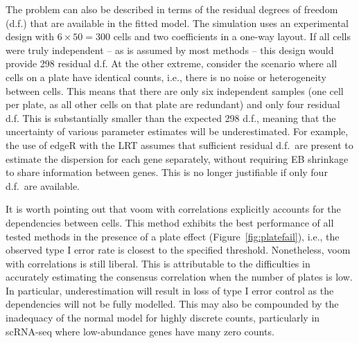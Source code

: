 \documentclass[oupdraft]{bio}
\begin{document}
The problem can also be described in terms of the residual degrees of freedom (d.f.) that are available in the fitted model.
The simulation uses an experimental design with $6 \times 50 =  300$ cells and two coefficients in a one-way layout.
If all cells were truly independent -- as is assumed by most methods -- this design would provide 298 residual d.f. 
At the other extreme, consider the scenario where all cells on a plate have identical counts, i.e., there is no noise or heterogeneity between cells.
This means that there are only six independent samples (one cell per plate, as all other cells on that plate are redundant) and only four residual d.f.
This is substantially smaller than the expected 298 d.f., meaning that the uncertainty of various parameter estimates will be underestimated.
For example, the use of edgeR with the LRT assumes that sufficient residual d.f.\ are present to estimate the dispersion for each gene separately,
    without requiring EB shrinkage to share information between genes.
This is no longer justifiable if only four d.f.\ are available.

It is worth pointing out that voom with correlations explicitly accounts for the dependencies between cells.
This method exhibits the best performance of all tested methods in the presence of a plate effect (Figure~\ref{fig:platefail}),
    i.e., the observed type I error rate is closest to the specified threshold.
Nonetheless, voom with correlations is still liberal.
This is attributable to the difficulties in accurately estimating the consensus correlation when the number of plates is low.
In particular, underestimation will result in loss of type I error control as the dependencies will not be fully modelled.
This may also be compounded by the inadequacy of the normal model for highly discrete counts, particularly in scRNA-seq where low-abundance genes have many zero counts.

\end{document}
